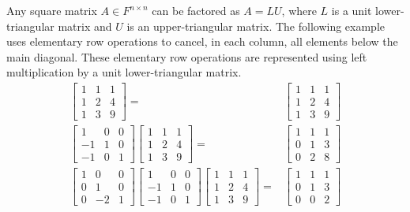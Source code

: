 Any square matrix $A \in F^{n \times n}$ can be factored as $A = LU$, where $L$ is a unit lower-triangular matrix and $U$ is an upper-triangular matrix.
The following example uses elementary row operations to cancel, in each column, all elements below the main diagonal.
These elementary row operations are represented using left multiplication by a unit lower-triangular matrix.
\begin{align*}
\left[ \begin{array}{ccc} 1 & 1 & 1 \\ 1 & 2 & 4 \\ 1 & 3 & 9 \end{array} \right] 
= & \left[ \begin{array}{ccc} 1 & 1 & 1 \\ 1 & 2 & 4 \\ 1 & 3 & 9 \end{array} \right] \\
\left[ \begin{array}{ccc} 1 & 0 & 0 \\ -1 & 1 & 0 \\ -1 & 0 & 1 \end{array} \right]
\left[ \begin{array}{ccc} 1 & 1 & 1 \\ 1 & 2 & 4 \\ 1 & 3 & 9 \end{array} \right]
= & \left[ \begin{array}{ccc} 1 & 1 & 1 \\ 0 & 1 & 3 \\ 0 & 2 & 8 \end{array} \right] \\
\left[ \begin{array}{ccc} 1 & 0 & 0 \\ 0 & 1 & 0 \\ 0 & -2 & 1 \end{array} \right]
\left[ \begin{array}{ccc} 1 & 0 & 0 \\ -1 & 1 & 0 \\ -1 & 0 & 1 \end{array} \right]
\left[ \begin{array}{ccc} 1 & 1 & 1 \\ 1 & 2 & 4 \\ 1 & 3 & 9 \end{array} \right]
= & \left[ \begin{array}{ccc} 1 & 1 & 1 \\ 0 & 1 & 3 \\ 0 & 0 & 2 \end{array} \right]
\end{align*}
